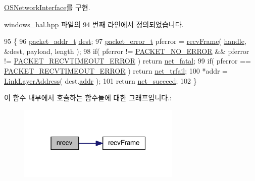\hyperlink{class_o_s_network_interface_a180931fa9d850cc342bc0ecd7b04e12a}{O\+S\+Network\+Interface}를 구현.



windows\+\_\+hal.\+hpp 파일의 94 번째 라인에서 정의되었습니다.


\begin{DoxyCode}
95     \{
96         \hyperlink{structpacket__addr__t}{packet\_addr\_t} \hyperlink{namespaceastime__fitline_ab0bede79c5f4cbed9c2cd932a0ace201}{dest};
97         \hyperlink{packet_8hpp_ab3fbaeb946a71bfe3ce597df43a5dc27}{packet\_error\_t} pferror = \hyperlink{packet_8cpp_a94b6be1e30ff3ec7c10bdf0b0b77d847}{recvFrame}( \hyperlink{class_windows_p_c_a_p_network_interface_af365a053e5f8823efe7e4ed6a209cd8e}{handle}, &dest, payload, length );
98         \textcolor{keywordflow}{if}( pferror != \hyperlink{packet_8hpp_ab3fbaeb946a71bfe3ce597df43a5dc27a1d7065f5b2e237a9ae36fafa1557ef31}{PACKET\_NO\_ERROR} && pferror != 
      \hyperlink{packet_8hpp_ab3fbaeb946a71bfe3ce597df43a5dc27af586fe85410e021b2519495b8a658533}{PACKET\_RECVTIMEOUT\_ERROR} ) \textcolor{keywordflow}{return} \hyperlink{avbts__osnet_8hpp_a21b2b4b5e479ef3adfc039ac30c961cda2ab09e0547baba0a6c07a8d53e1529a5}{net\_fatal};
99         \textcolor{keywordflow}{if}( pferror == \hyperlink{packet_8hpp_ab3fbaeb946a71bfe3ce597df43a5dc27af586fe85410e021b2519495b8a658533}{PACKET\_RECVTIMEOUT\_ERROR} ) \textcolor{keywordflow}{return} 
      \hyperlink{avbts__osnet_8hpp_a21b2b4b5e479ef3adfc039ac30c961cda02bf20698d895d3c6a6db8926645d69b}{net\_trfail};
100         *addr = \hyperlink{class_link_layer_address}{LinkLayerAddress}( dest.\hyperlink{structpacket__addr__t_ab8af51bba340e97aebc45b9c943fb17c}{addr} );
101         \textcolor{keywordflow}{return} \hyperlink{avbts__osnet_8hpp_a21b2b4b5e479ef3adfc039ac30c961cda349eff10b7ad8aef2477575f9306e579}{net\_succeed};
102     \}
\end{DoxyCode}


이 함수 내부에서 호출하는 함수들에 대한 그래프입니다.\+:
\nopagebreak
\begin{figure}[H]
\begin{center}
\leavevmode
\includegraphics[width=220pt]{class_windows_p_c_a_p_network_interface_a08a4fa234a006e89838677a381d8e052_cgraph}
\end{center}
\end{figure}


